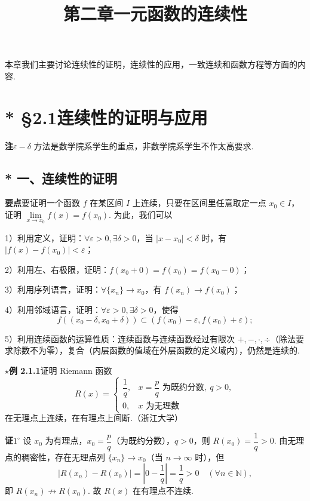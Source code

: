 \documentclass[UTF8, 12pt, fontset=fandol, oneside]{ctexart}
\title{第二章\quad 一元函数的连续性}
\author{}
\date{}
\begin{document}
\maketitle

本章我们主要讨论连续性的证明，连续性的应用，一致连续和函数方程等方面的内容.

\section*{* §2.1\quad 连续性的证明与应用}

\noindent\textbf{注}\quad $\varepsilon-\delta$ 方法是数学院系学生的重点，非数学院系学生不作太高要求.

\subsection*{* 一、连续性的证明}

\noindent\textbf{要点}\quad 要证明一个函数 $f$ 在某区间 $I$ 上连续，只要在区间里任意取定一点 $x_0\in I$，证明 $\lim\limits_{x\to x_0}f(x)=f(x_0)$. 为此，我们可以

1）利用定义，证明：$\forall\varepsilon>0,\exists\delta>0$，当 $|x-x_0|<\delta$ 时，有 $|f(x)-f(x_0)|<\varepsilon$；

2）利用左、右极限，证明：$f(x_0+0)=f(x_0)=f(x_0-0)$；

3）利用序列语言，证明：$\forall\{x_n\}\to x_0$，有 $f(x_n)\to f(x_0)$；

4）利用邻域语言，证明：$\forall\varepsilon>0,\exists\delta>0$，使得
\[
  f((x_0-\delta,x_0+\delta))\subset (f(x_0)-\varepsilon,f(x_0)+\varepsilon);
\]

5）利用连续函数的运算性质：连续函数与连续函数经过有限次 $+,-,\cdot,\div$（除法要求除数不为零），复合（内层函数的值域在外层函数的定义域内），仍然是连续的.

\noindent\textbf{$\star$例 2.1.1}\quad 证明 Riemann 函数
\[
  R(x)=
  \begin{cases}
    \dfrac1q, & x=\dfrac pq\text{ 为既约分数},\ q>0,\\
    0, & x\text{ 为无理数}
  \end{cases}
\]
在无理点上连续，在有理点上间断.（浙江大学）

\noindent\textbf{证}\quad $1^\circ$ 设 $x_0$ 为有理点，$x_0=\dfrac pq$（为既约分数），$q>0$，则 $R(x_0)=\dfrac1q>0$. 由无理点的稠密性，存在无理点列 $\{x_n\}\to x_0$（当 $n\to\infty$ 时），但
\[
  |R(x_n)-R(x_0)|=\left|0-\frac1q\right|=\frac1q>0\quad(\forall n\in\mathbb{N}),
\]
即 $R(x_n)\not\to R(x_0)$. 故 $R(x)$ 在有理点不连续.
\end{document}
